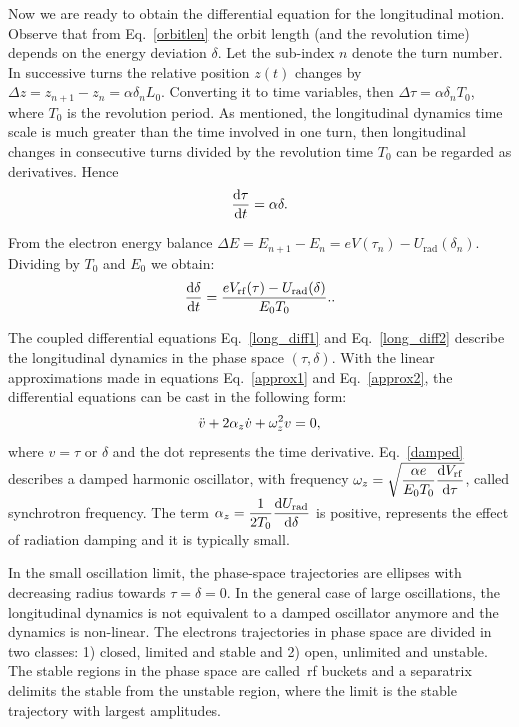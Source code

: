 Now we are ready to obtain the differential equation for the longitudinal motion. Observe that from Eq.~\eqref{orbitlen} the orbit length (and the revolution time) depends on the energy deviation $\delta$. Let the sub-index $n$ denote the turn number. In successive turns the relative position $z(t)$ changes by $\Delta z = z_{n+1} - z_n = \alpha\delta_n L_0$. Converting it to time variables, then $\Delta \tau = \alpha \delta_n T_0$, where $T_0$ is the revolution period. As mentioned, the longitudinal dynamics time scale is much greater than the time involved in one turn, then longitudinal changes in consecutive turns divided by the revolution time $T_0$ can be regarded as derivatives. Hence
\begin{equation}
    \dfrac{\mathrm{d} \tau}{\mathrm{d} t} = \alpha \delta.
    \label{long_diff1}
\end{equation}

From the electron energy balance $\Delta E = E_{n+1} - E_n = eV(\tau_n) - U_{\mathrm{rad}}(\delta_n)$. Dividing by $T_0$ and $E_0$ we obtain:
\begin{equation}
    \dfrac{\mathrm{d} \delta}{\mathrm{d} t} = \dfrac{eV_{\mathrm{rf}}(\tau) - U_{\mathrm{rad}}(\delta)}{E_0 T_0}.
    \label{long_diff2}.
\end{equation}

The coupled differential equations Eq.~\eqref{long_diff1} and Eq.~\eqref{long_diff2} describe the longitudinal dynamics in the phase space $(\tau, \delta)$. With the linear approximations made in equations Eq.~\eqref{approx1} and Eq.~\eqref{approx2}, the differential equations can be cast in the following form:
\begin{equation}
    \Ddot{v} + 2\alpha_{z} \dot{v} + \omega_{z}^2 v = 0,
    \label{damped}
\end{equation}
where $v=\tau$ or $\delta$ and the dot represents the time derivative. Eq.~\eqref{damped} describes a damped harmonic oscillator, with frequency $\omega_z = \sqrt{\dfrac{\alpha e}{E_0 T_0} \dfrac{\mathrm{d} V_{\mathrm{rf}}}{\mathrm{d} \tau}}$, called synchrotron frequency. The term $\alpha_z = \dfrac{1}{2T_0} \dfrac{\mathrm{d} U_{\mathrm{rad}}}{\mathrm{d} \delta}$ is positive, represents the effect of radiation damping and it is typically small. 

In the small oscillation limit, the phase-space trajectories are ellipses with decreasing radius towards $\tau = \delta = 0$. In the general case of large oscillations, the longitudinal dynamics is not equivalent to a damped oscillator anymore and the dynamics is non-linear. The electrons trajectories in phase space are divided in two classes: 1) closed, limited and stable and 2) open, unlimited and unstable. The stable regions in the phase space are called~\gls{rf} buckets and a separatrix delimits the stable from the unstable region, where the limit is the stable trajectory with largest amplitudes.

